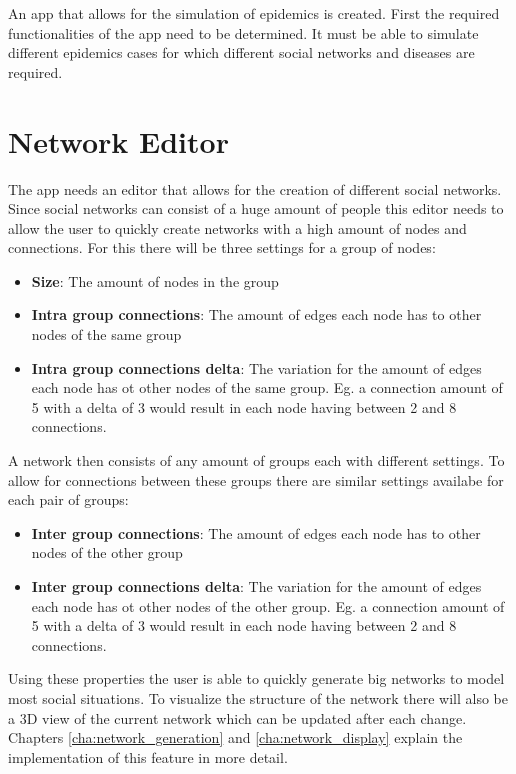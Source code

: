 An app that allows for the simulation of epidemics is created. First the required functionalities
of the app need to be determined. It must be able to simulate different epidemics cases for
which different social networks and diseases are required.

\section{Network Editor}
The app needs an editor that allows for the creation of different social networks. Since
social networks can consist of a huge amount of people this editor needs to allow the user
to quickly create networks with a high amount of nodes and connections. For this there
will be three settings for a group of nodes:

\begin{itemize}
    \item \textbf{Size}: The amount of nodes in the group
    \item \textbf{Intra group connections}: The amount of edges each node has to other nodes
    of the same group
    \item \textbf{Intra group connections delta}: The variation for the amount of edges each
    node has ot other nodes of the same group. Eg. a connection amount of 5 with a delta of 3
    would result in each node having between 2 and 8 connections.
\end{itemize}

A network then consists of any amount of groups each with different settings. To allow
for connections between these groups there are similar settings availabe for each pair of
groups:

\begin{itemize}
    \item \textbf{Inter group connections}: The amount of edges each node has to other nodes
    of the other group
    \item \textbf{Inter group connections delta}: The variation for the amount of edges each
    node has ot other nodes of the other group. Eg. a connection amount of 5 with a delta of 3
    would result in each node having between 2 and 8 connections.
\end{itemize}

Using these properties the user is able to quickly generate big networks to model most
social situations. To visualize the structure of the network there will also be a 3D view
of the current network which can be updated after each change. Chapters \ref{cha:network_generation}
and \ref{cha:network_display} explain the implementation of this feature in more detail.

